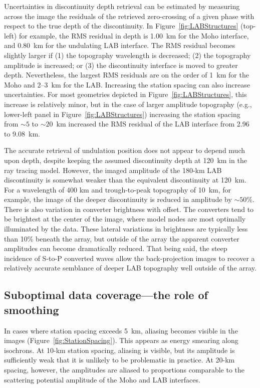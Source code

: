 \documentclass[referee]{gji}
\begin{document}
Uncertainties in discontinuity depth retrieval can be estimated by measuring across the image the residuals of the retrieved zero-crossing of a given phase with respect to the true depth of the discontinuity.  In Figure~\ref{fig:LABStructures} (top-left) for example, the RMS residual in depth is 1.00~km for the Moho interface, and 0.80~km for the undulating LAB interface.  The RMS residual becomes slightly larger if (1) the topography wavelength is decreased; (2) the topography amplitude is increased; or (3) the discontinuity interface is moved to greater depth.  Nevertheless, the largest RMS residuals are on the order of 1~km for the Moho and 2--3~km for the LAB.  Increasing the station spacing can also increase uncertainties.  For most geometries depicted in Figure~\ref{fig:LABStructures}, this increase is relatively minor, but in the case of larger amplitude topography (e.g., lower-left panel in Figure~\ref{fig:LABStructures}) increasing the station spacing from $\sim 5$ to $\sim 20$~km increased the RMS residual of the LAB interface from 2.96 to 9.08~km.

The accurate retrieval of undulation position does not appear to depend much upon depth, despite keeping the assumed discontinuity depth at 120~km in the ray tracing model.  However, the imaged amplitude of the 180-km LAB discontinuity is somewhat weaker than the equivalent discontinuity at 120~km.  For a wavelength of 400 km and trough-to-peak topography of 10~km, for example, the image of the deeper discontinuity is reduced in amplitude by $\sim 50$\%.  There is also variation in converter brightness with offset.  The converters tend to be brightest at the center of the image, where model nodes are most optimally illuminated by the data.  These lateral variations in brightness are typically less than 10\% beneath the array, but outside of the array the apparent converter amplitudes can become dramatically reduced.  That being said, the steep incidence of S-to-P converted waves allow the back-projection images to recover a relatively accurate semblance of deeper LAB topography well outside of the array.

\subsection{Suboptimal data coverage---the role of smoothing}

In cases where station spacing exceeds 5~km, aliasing becomes visible in the images (Figure~\ref{fig:StationSpacing}).  This appears as energy smearing along isochrons.  At 10-km station spacing, aliasing is visible, but its amplitude is sufficiently weak that it is unlikely to be problematic in practice. At 20-km spacing, however, the amplitudes are aliased to proportions comparable to the scattering potential amplitude of the Moho and LAB interfaces.
\end{document}
